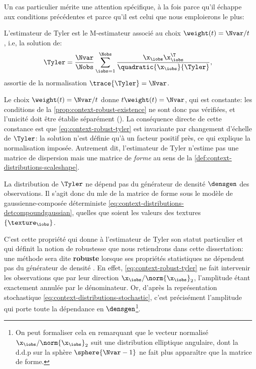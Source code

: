 Un cas particulier mérite une attention spécifique, à la fois parce qu'il échappe aux conditions précédentes et parce qu'il est celui que nous emploierons le plus:

\begin{definition}
\label{def:context-robust-tyler}
  L'estimateur de Tyler  est le M-estimateur associé au choix $\weight(t)=\Nvar/t$, i.e, la solution de:
\begin{equation}
  \Tyler
  =
  \frac{\Nvar}{\Nobs}\sum_{\iobs=1}^{\Nobs}
  \frac{\x_\iobs\x_\iobs^\T}{\quadratic{\x_\iobs}{\Tyler}},
  \label{eq:context-robust-tyler}
\end{equation}
  assortie de la normalisation $\trace{\Tyler}=\Nvar$.
\end{definition}

\begin{remark}
  Le choix $\weight(t)=\Nvar/t$ donne $t\weight(t)=\Nvar$, qui est constante: les conditions de la \cref{prop:context-robust-existence} ne sont donc pas vérifiées, et l'unicité doit être établie séparément (\cite{Pascal08a}). La conséquence directe de cette constance est que \cref{eq:context-robust-tyler} est invariante par changement d'échelle de $\Tyler$: la solution n'est définie qu'à un facteur positif près, ce qui explique la normalisation imposée. Autrement dit, l'estimateur de Tyler n'estime pas une matrice de dispersion mais une matrice de \emph{forme} au sens de la \cref{def:context-distributions-scaleshape}.
\end{remark}

\begin{property}
\label{prop:context-robust-distributionfree}
  La distribution de $\Tyler$ ne dépend pas du générateur de densité $\densgen$ des observations. Il s'agit donc du mle de la matrice de forme sous le modèle de gaussienne-composée déterministe \cref{eq:context-distributions-detcompoundgaussian}, quelles que soient les valeurs des textures $\{\texture_\iobs\}$.
\end{property}

\begin{remark}
  C'est cette propriété qui donne à l'estimateur de Tyler son statut particulier et qui définit la notion de robustesse que nous retiendrons dans cette dissertation: une méthode sera dite \textbf{robuste} lorsque ses propriétés statistiques ne dépendent pas du générateur de densité . En effet, \cref{eq:context-robust-tyler} ne fait intervenir les observations que par leur direction $\x_\iobs/\norm{\x_\iobs}_2$, l'amplitude étant exactement annulée par le dénominateur. Or, d'après la représentation stochastique \cref{eq:context-distributions-stochastic}, c'est précisément l'amplitude qui porte toute la dépendance en $\densgen$\footnote{On peut formaliser cela en remarquant que le vecteur normalisé $\x_\iobs/\norm{\x_\iobs}_2$ suit une distribution elliptique angulaire, dont la d.d.p sur la sphère $\sphere{\Nvar-1}$ ne fait plus apparaître que la matrice de forme.}.
\end{remark}

